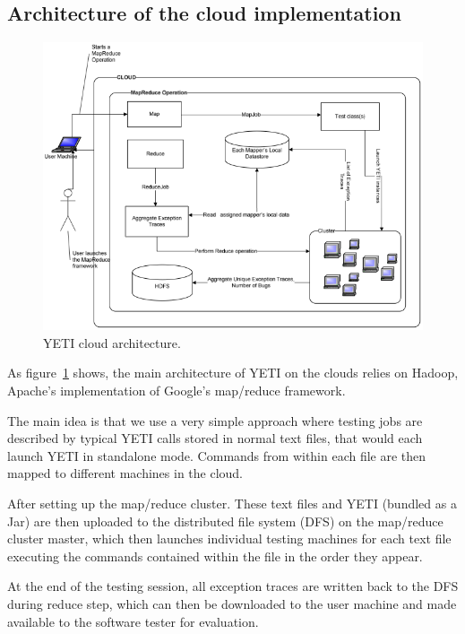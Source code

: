 \subsection{Architecture of the cloud implementation}
\begin{figure}[h]
\begin{center}
\includegraphics[width=14cm]{images/YetiCloud.png}
\end{center}
\caption{YETI cloud architecture.}\label{fig:architecture}
\end{figure}


As figure~\ref{fig:architecture} shows, the main architecture of YETI on the clouds 
relies on Hadoop, Apache's implementation of Google's map/reduce framework. 

The main idea is that we use a very simple approach where testing jobs 
are described by typical YETI calls stored in normal text files, that would each launch YETI in standalone mode. 
Commands from within each file are then mapped to different machines in the cloud. 

After setting up the map/reduce cluster. These text files and YETI (bundled as a Jar) are then uploaded to the 
distributed file system (DFS) on the map/reduce cluster master, which then launches individual testing machines 
for each text file executing the commands contained within the file in the order they appear.

At the end of the testing session, all exception traces are written back to the DFS during reduce step, which can then be downloaded to the 
user machine and made available to the software tester for evaluation.


